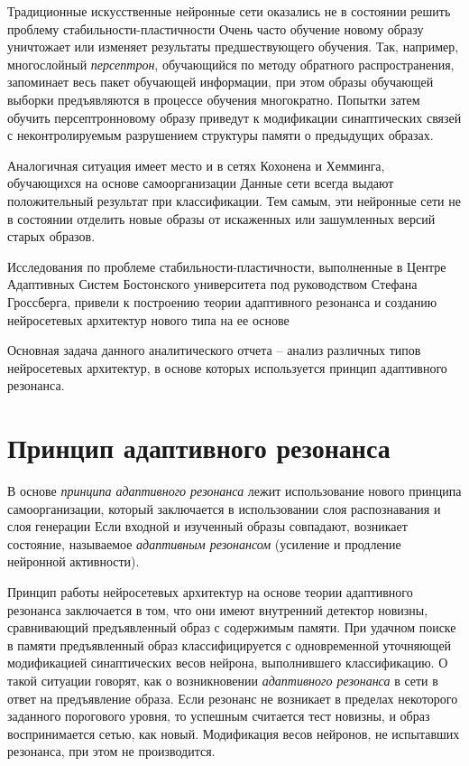 \documentclass[14pt,a4paper,report]{article}
\begin{document}
Традиционные искусственные нейронные сети оказались не в состоянии решить проблему стабильности-пластичности \cite{cite-kgeu-adapt} Очень часто обучение новому образу уничтожает или изменяет результаты предшествующего
обучения.  Так, например, многослойный \textit{персептрон}, обучающийся по методу обратного распространения, запоминает весь пакет обучающей информации, при этом образы обучающей выборки предъявляются в процессе обучения многократно. Попытки затем обучить персептронновому образу приведут к модификации синаптических связей с неконтролируемым разрушением структуры памяти о предыдущих образах. 

Аналогичная ситуация имеет место и в сетях Кохонена и Хемминга, обучающихся на основе самоорганизации \cite{cite-kgeu-adapt} Данные сети всегда выдают положительный результат при классификации. Тем самым, эти нейронные сети не в состоянии отделить новые образы от искаженных или зашумленных версий старых образов. 

Исследования по проблеме стабильности-пластичности, выполненные в Центре Адаптивных Систем Бостонского университета под руководством Стефана Гроссберга, привели к построению теории адаптивного резонанса и созданию нейросетевых архитектур нового типа на ее основе \cite{cite-lek-narod}

Основная задача данного аналитического отчета -- анализ различных типов нейросетевых архитектур, в основе которых используется принцип адаптивного резонанса.

\section{Принцип адаптивного резонанса}

В основе \textit{принципа адаптивного резонанса} лежит использование нового принципа самоорганизации, который заключается в использовании слоя распознавания  и слоя генерации  \cite[с.~81]{book-simon-neural} Если входной и изученный образы совпадают, возникает состояние, называемое \textit{адаптивным резонансом} (усиление и продление нейронной активности).

Принцип работы нейросетевых архитектур на основе теории адаптивного резонанса заключается в том, что они имеют внутренний детектор новизны, сравнивающий предъявленный образ с содержимым памяти. При удачном поиске в памяти предъявленный образ классифицируется с одновременной уточняющей модификацией синаптических весов нейрона, выполнившего классификацию. О такой ситуации говорят, как о возникновении \textit{адаптивного резонанса} в сети в ответ на предъявление образа. Если резонанс не возникает в пределах некоторого заданного порогового уровня, то успешным считается тест новизны, и образ воспринимается сетью, как новый. Модификация весов нейронов, не испытавших резонанса, при этом не производится.
\end{document}
